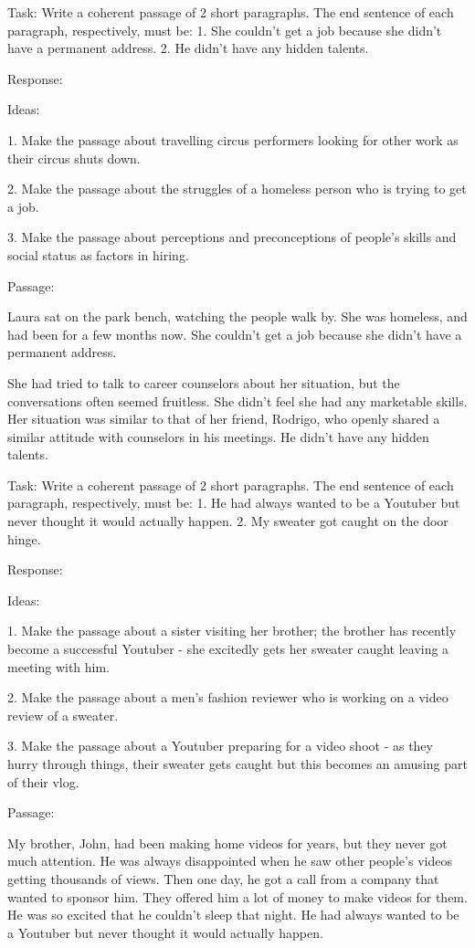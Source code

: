 \documentclass[11pt]{article}
\begin{document}
Task: Write a coherent passage of 2 short paragraphs. The end sentence of each paragraph, respectively, must be: 1. She couldn't get a job because she didn't have a permanent address. 2. He didn't have any hidden talents.

Response: 

Ideas:

1. Make the passage about travelling circus performers looking for other work as their circus shuts down.

2. Make the passage about the struggles of a homeless person who is trying to get a job. 

3. Make the passage about perceptions and preconceptions of people's skills and social status as factors in hiring.

Passage: 

Laura sat on the park bench, watching the people walk by. She was homeless, and had been for a few months now. She couldn't get a job because she didn't have a permanent address.

She had tried to talk to career counselors about her situation, but the conversations often seemed fruitless. She didn't feel she had any marketable skills. Her situation was similar to that of her friend, Rodrigo, who openly shared a similar attitude with counselors in his meetings. He didn't have any hidden talents.

Task: Write a coherent passage of 2 short paragraphs. The end sentence of each paragraph, respectively, must be: 1. He had always wanted to be a Youtuber but never thought it would actually happen. 2. My sweater got caught on the door hinge.

Response:

Ideas:

1. Make the passage about a sister visiting her brother; the brother has recently become a successful Youtuber - she excitedly gets her sweater caught leaving a meeting with him.

2. Make the passage about a men's fashion reviewer who is working on a video review of a sweater.

3. Make the passage about a Youtuber preparing for a video shoot - as they hurry through things, their sweater gets caught but this becomes an amusing part of their vlog.

Passage:

My brother, John, had been making home videos for years, but they never got much attention. He was always disappointed when he saw other people's videos getting thousands of views. Then one day, he got a call from a company that wanted to sponsor him. They offered him a lot of money to make videos for them. He was so excited that he couldn't sleep that night. He had always wanted to be a Youtuber but never thought it would actually happen.
\end{document}
